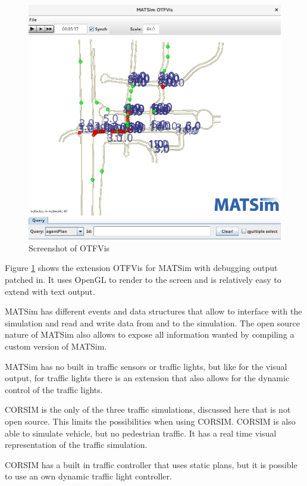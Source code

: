 \begin{figure}[!ht]
  \centering
  \includegraphics[width=12cm]{figures/otfvis}
  \caption[Screenshot of OTFVis]{Screenshot of OTFVis \protect\footnotemark}
  \label{otfvis}
\end{figure}


Figure \ref{otfvis} shows the extension OTFVis for MATSim with debugging output patched in. It uses OpenGL to render to the screen and is relatively easy to extend with text output.

MATSim has different events and data structures that allow to interface with the simulation and read and write data from and to the simulation. The open source nature of MATSim also allows to expose all information wanted by compiling a custom version of MATSim.

MATSim has no built in traffic sensors or traffic lights, but like for the visual output, for traffic lights there is an extension that also allows for the dynamic control of the traffic lights.

CORSIM is the only of the three traffic simulations, discussed here that is not open source. This limits the possibilities when using CORSIM. CORSIM is also able to simulate vehicle, but no pedestrian traffic. It has a real time visual representation of the traffic simulation.

CORSIM has a built in traffic controller that uses static plans, but it is possible to use an own dynamic traffic light controller.

